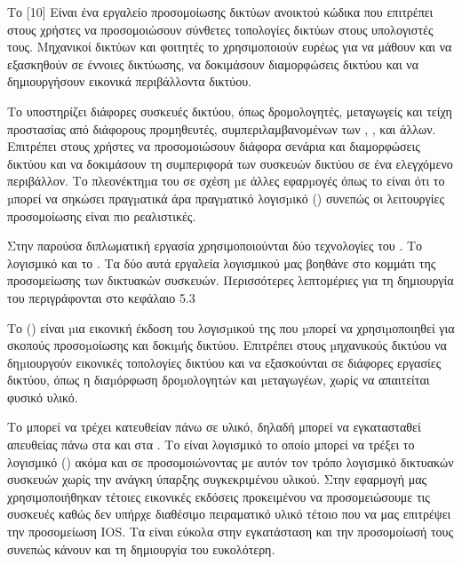 Το [10] Είναι ένα εργαλείο προσομοίωσης δικτύων ανοικτού κώδικα που επιτρέπει στους χρήστες να προσομοιώσουν 
σύνθετες τοπολογίες δικτύων στους υπολογιστές τους. Μηχανικοί δικτύων και φοιτητές το χρησιμοποιούν ευρέως για να μάθουν και να εξασκηθούν σε έννοιες δικτύωσης, να δοκιμάσουν διαμορφώσεις δικτύου και να δημιουργήσουν εικονικά περιβάλλοντα δικτύου.


Το  υποστηρίζει διάφορες συσκευές δικτύου, όπως δρομολογητές, μεταγωγείς και τείχη προστασίας 
από διάφορους προμηθευτές, συμπεριλαμβανομένων των , ,  και άλλων. Επιτρέπει στους χρήστες να 
προσομοιώσουν διάφορα σενάρια και διαμορφώσεις δικτύου και να δοκιμάσουν τη συμπεριφορά των 
συσκευών δικτύου σε ένα ελεγχόμενο περιβάλλον. Το πλεονέκτηµα του  σε σχέση µε άλλες εφαρµογές όπως το  είναι ότι το  µπορεί να σηκώσει πραγµατικά  άρα πραγµατικό λογισµικό () συνεπώς οι λειτουργίες προσομοίωσης είναι πιο ρεαλιστικές.

Στην παρούσα διπλωματική εργασία χρησιμοποιούνται δύο τεχνολογίες του . Το  λογισμικό και το . Τα δύο αυτά εργαλεία λογισμικού μας βοηθάνε στο κομμάτι της προσομείωσης των δικτυακών συσκευών. Περισσότερες λεπτομέριες για τη δημιουργία του  περιγράφονται στο κεφάλαιο 5.3

Το  () είναι µια εικονική έκδοση του λογισµικού  της  που µπορεί να χρησιµοποιηθεί για σκοπούς προσοµοίωσης και δοκιµής δικτύου. Επιτρέπει στους µηχανικούς δικτύου να δηµιουργούν εικονικές τοπολογίες δικτύου και να εξασκούνται σε διάφορες εργασίες δικτύου, όπως η διαµόρφωση δροµολογητών και µεταγωγέων, χωρίς να απαιτείται φυσικό υλικό. 


Το  μπορεί να τρέχει κατευθείαν πάνω σε υλικό, δηλαδή μπορεί να εγκατασταθεί απευθείας πάνω στα  και στα  . Το  είναι λογισμικό το οποίο μπορεί να τρέξει το λογισμικό () ακόμα και σε  προσομοιώνοντας με αυτόν τον τρόπο λογισμικό δικτυακών συσκευών χωρίς την ανάγκη ύπαρξης συγκεκριμένου υλικού. Στην εφαρμογή μας χρησιμοποιήθηκαν τέτοιες εικονικές εκδόσεις προκειμένου να προσομειώσουμε τις  συσκευές καθώς δεν υπήρχε διαθέσιμο πειραματικό υλικό τέτοιο που να μας επιτρέψει την προσομείωση IOS. Τα  είναι εύκολα στην εγκατάσταση και την προσομοίωσή τους συνεπώς κάνουν και τη δημιουργία του  ευκολότερη.



